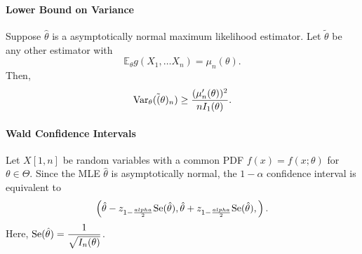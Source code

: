 
\paragraph{Lower Bound on Variance}
Suppose \(\hat{\theta}\) is a asymptotically normal maximum likelihood estimator.
Let \(\tilde{\theta}\) be any other estimator with \[
  \mathbb{E}_\theta g(X_1, \ldots X_n) = \mu_n(\theta)
.\] 
Then, \[
  \mathrm{Var}_\theta(\tilde(\theta)_n) \geq \frac{(\mu_n' (\theta))^2}{nI_1(\theta)}
.\] 

\paragraph{Wald Confidence Intervals}
Let \(X[1, n]\) be random variables with a common PDF  \(f(x) = f(x; \theta)\) for
\(\theta \in \Theta\). Since the MLE \(\hat{\theta}\) is asymptotically
normal, the \(1 - \alpha\) confidence interval is equivalent to  \[
  \left( 
  \hat{\theta} - z_{1 - \frac{alpha}{2}} \mathrm{Se}(\hat{\theta}),
\hat{\theta} + z_{1 - \frac{alpha}{2}} \mathrm{Se}(\hat{\theta}),
  \right) 
.\] Here, \(\mathrm{Se}(\hat{\theta}) = \dfrac{1}{\sqrt{I_n(\theta)} }\).


